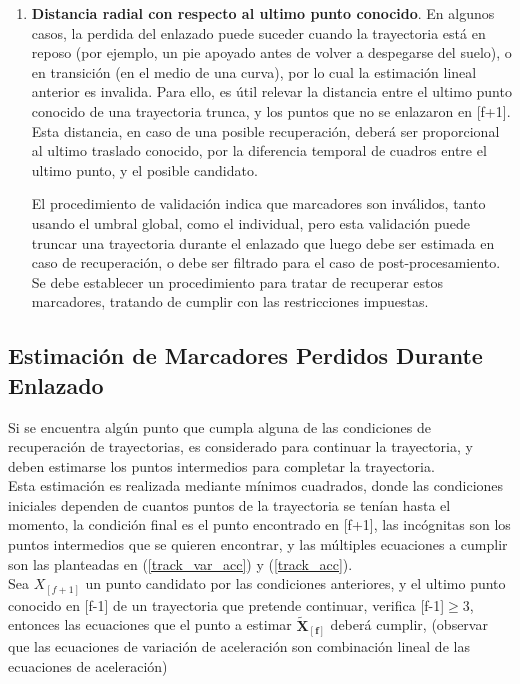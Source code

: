 \begin{itemize}
\begin{enumerate}
  \item \textbf{Distancia radial con respecto al ultimo punto conocido}. En algunos casos, la perdida del enlazado puede suceder cuando la trayectoria está en reposo (por ejemplo, un pie apoyado antes de volver a despegarse del suelo), o en transición (en el medio de una curva), por lo cual la estimación lineal anterior es invalida. Para ello, es útil relevar la distancia entre el ultimo punto conocido de una trayectoria trunca, y los puntos que no se enlazaron en [f+1]. Esta distancia, en caso de una posible recuperación, deberá ser proporcional al ultimo traslado conocido, por la diferencia temporal de cuadros entre el ultimo punto, y el posible candidato.
 
El procedimiento de validación indica que marcadores son inválidos, tanto usando el umbral global, como el individual, pero esta validación puede truncar una trayectoria durante el enlazado que luego debe ser estimada en caso de recuperación, o debe ser filtrado para el caso de post-procesamiento. Se debe establecer un procedimiento para tratar de recuperar estos marcadores, tratando de cumplir con las restricciones impuestas.
 
  
\end{enumerate} 

\end{itemize}

\subsection{Estimación de Marcadores Perdidos Durante Enlazado}

Si se encuentra algún punto que cumpla alguna de las condiciones de recuperación de trayectorias, es considerado para continuar la trayectoria, y deben estimarse los puntos intermedios para completar la trayectoria.
\\ 

Esta estimación es realizada mediante mínimos cuadrados, donde las condiciones iniciales dependen de cuantos puntos de la trayectoria se tenían hasta el momento, la condición final es el punto encontrado en [f+1], las incógnitas son los puntos intermedios que se quieren encontrar, y las múltiples ecuaciones a cumplir son las planteadas en (\ref{track_var_acc}) y (\ref{track_acc}).
\\ 

Sea $X_{[f+1]}$ un punto candidato por las condiciones anteriores, y el ultimo punto conocido en [f-1] de un trayectoria que pretende continuar, verifica [f-1]$\geq$3, entonces las ecuaciones que el punto a estimar $\boldsymbol{\tilde{X}_{[f]}}$ deberá cumplir, (observar que las ecuaciones de variación de aceleración son combinación lineal de las ecuaciones de aceleración)

